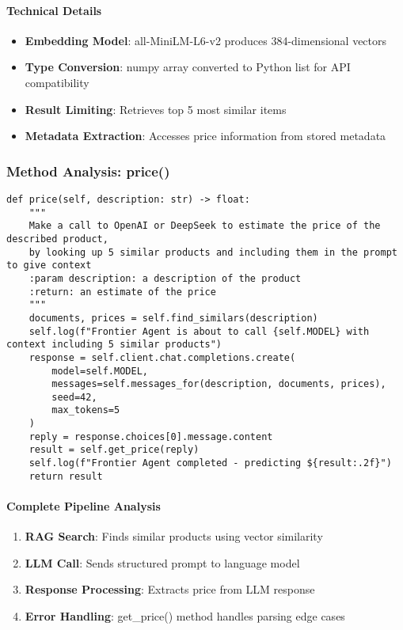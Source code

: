 \paragraph{Technical Details}
\begin{itemize}
\item \textbf{Embedding Model}: all-MiniLM-L6-v2 produces 384-dimensional vectors
\item \textbf{Type Conversion}: numpy array converted to Python list for API compatibility
\item \textbf{Result Limiting}: Retrieves top 5 most similar items
\item \textbf{Metadata Extraction}: Accesses price information from stored metadata
\end{itemize}

\subsubsection{Method Analysis: price()}

\begin{lstlisting}[caption=Complete Price Prediction Pipeline]
def price(self, description: str) -> float:
    """
    Make a call to OpenAI or DeepSeek to estimate the price of the described product,
    by looking up 5 similar products and including them in the prompt to give context
    :param description: a description of the product
    :return: an estimate of the price
    """
    documents, prices = self.find_similars(description)
    self.log(f"Frontier Agent is about to call {self.MODEL} with context including 5 similar products")
    response = self.client.chat.completions.create(
        model=self.MODEL, 
        messages=self.messages_for(description, documents, prices),
        seed=42,
        max_tokens=5
    )
    reply = response.choices[0].message.content
    result = self.get_price(reply)
    self.log(f"Frontier Agent completed - predicting ${result:.2f}")
    return result
\end{lstlisting}

\paragraph{Complete Pipeline Analysis}
\begin{enumerate}
\item \textbf{RAG Search}: Finds similar products using vector similarity
\item \textbf{LLM Call}: Sends structured prompt to language model
\item \textbf{Response Processing}: Extracts price from LLM response
\item \textbf{Error Handling}: get\_price() method handles parsing edge cases
\end{enumerate}


